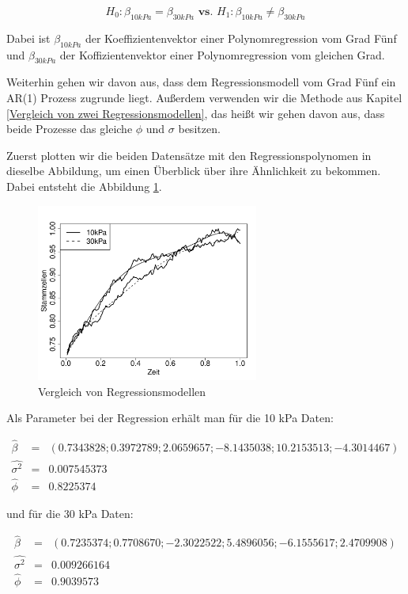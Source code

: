 \documentclass[12pt,a4paper]{article}
\theoremstyle{definition}
\theoremstyle{definition}
\theoremstyle{definition}
\theoremstyle{definition}
\begin{document}
\begin{equation*}
H_0 : \beta_{10 kPa} = \beta_{30 kPa} \textbf{ vs. } H_1 : \beta_{10 kPa} \neq \beta_{30 kPa}
\end{equation*}

Dabei ist $\beta_{10 kPa}$ der Koeffizientenvektor einer Polynomregression vom Grad Fünf und $\beta_{30 kPa}$ der Koffizientenvektor einer Polynomregression vom gleichen Grad. 

Weiterhin gehen wir davon aus, dass dem Regressionsmodell vom Grad Fünf ein AR(1) Prozess zugrunde liegt. Außerdem verwenden wir die Methode aus Kapitel \ref{Vergleich von zwei Regressionsmodellen}, das heißt wir gehen davon aus, dass beide Prozesse das gleiche $\phi$ und $\sigma$ besitzen.

Zuerst plotten wir die beiden Datensätze mit den Regressionspolynomen in dieselbe Abbildung, um einen Überblick über ihre Ähnlichkeit zu bekommen. Dabei entsteht die Abbildung \ref{Vergleich-10-30}.


\begin{figure}[H] 
  \centering
     \includegraphics[width=0.65\textwidth]{Vergleich-10vs30-poly5}
  \caption{Vergleich von Regressionsmodellen}
  \label{Vergleich-10-30}
\end{figure}

Als Parameter bei der Regression erhält man für die 10 kPa Daten:

\begin{eqnarray*}
\hat{\beta} &=& (0.7343828 ;  0.3972789 ; 2.0659657 ; -8.1435038 ; 10.2153513 ; -4.3014467)  \\
\widehat{\sigma^2} &=& 0.007545373 \\
\hat{\phi} &=& 0.8225374
\end{eqnarray*}

und für die 30 kPa Daten:

\begin{eqnarray*}
\hat{\beta} &=& (0.7235374 ; 0.7708670 ; -2.3022522 ; 5.4896056 ; -6.1555617 ; 2.4709908) \\
\widehat{\sigma^2} &=& 0.009266164 \\
\hat{\phi} &=& 0.9039573
\end{eqnarray*}
\end{document}
